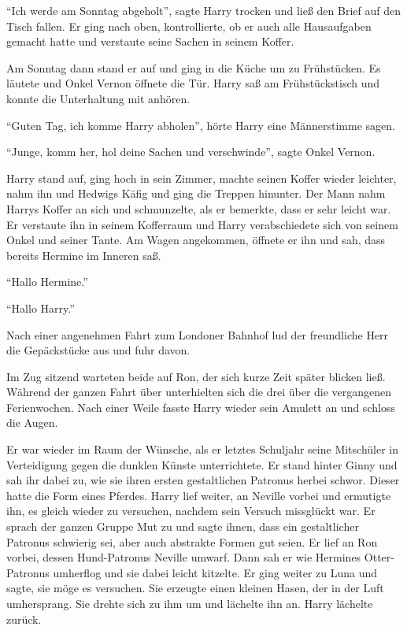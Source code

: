 \enquote{Ich werde am Sonntag abgeholt}, sagte Harry trocken und ließ den Brief auf den Tisch fallen. Er ging nach oben, kontrollierte, ob er auch alle Hausaufgaben gemacht hatte und verstaute seine Sachen in seinem Koffer.

Am Sonntag dann stand er auf und ging in die Küche um zu Frühstücken. Es läutete und Onkel Vernon öffnete die Tür. Harry saß am Frühstückstisch und konnte die Unterhaltung mit anhören.

\enquote{Guten Tag, ich komme Harry abholen}, hörte Harry eine Männerstimme sagen.

\enquote{Junge, komm her, hol deine Sachen und verschwinde}, sagte Onkel Vernon.

Harry stand auf, ging hoch in sein Zimmer, machte seinen Koffer wieder leichter, nahm ihn und Hedwigs Käfig und ging die Treppen hinunter. Der Mann nahm Harrys Koffer an sich und schmunzelte, als er bemerkte, dass er sehr leicht war. Er verstaute ihn in seinem Kofferraum und Harry verabschiedete sich von seinem Onkel und seiner Tante. Am Wagen angekommen, öffnete er ihn und sah, dass bereits Hermine im Inneren saß.

\enquote{Hallo Hermine.}

\enquote{Hallo Harry.}

Nach einer angenehmen Fahrt zum Londoner Bahnhof lud der freundliche Herr die Gepäckstücke aus und fuhr davon.

Im Zug sitzend warteten beide auf Ron, der sich kurze Zeit später blicken ließ. Während der ganzen Fahrt über unterhielten sich die drei über die vergangenen Ferienwochen. Nach einer Weile fasste Harry wieder sein Amulett an und schloss die Augen.

\begin{traum}
Er war wieder im Raum der Wünsche, als er letztes Schuljahr seine Mitschüler in Verteidigung gegen die dunklen Künste unterrichtete. Er stand hinter Ginny und sah ihr dabei zu, wie sie ihren ersten gestaltlichen Patronus herbei schwor. Dieser hatte die Form eines Pferdes. Harry lief weiter, an Neville vorbei und ermutigte ihn, es gleich wieder zu versuchen, nachdem sein Versuch missglückt war. Er sprach der ganzen Gruppe Mut zu und sagte ihnen, dass ein gestaltlicher Patronus schwierig sei, aber auch abstrakte Formen gut seien. Er lief an Ron vorbei, dessen Hund-Patronus Neville umwarf. Dann sah er wie Hermines Otter-Patronus umherflog und sie dabei leicht kitzelte. Er ging weiter zu Luna und sagte, sie möge es versuchen. Sie erzeugte einen kleinen Hasen, der in der Luft umhersprang. Sie drehte sich zu ihm um und lächelte ihn an. Harry lächelte zurück.
\end{traum}


